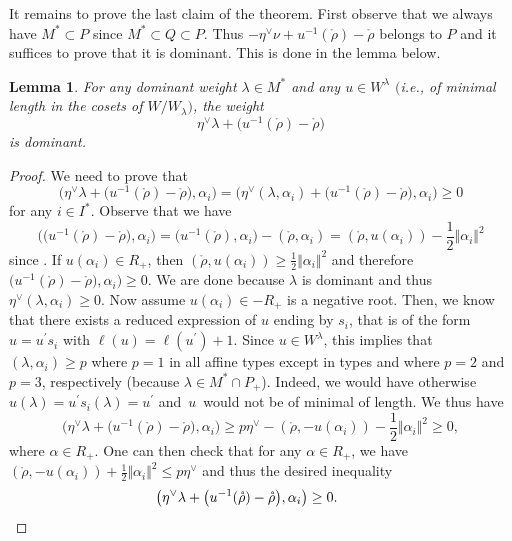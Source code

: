 \documentclass[pdftex]{sigma}
\newtheorem{Lemma}[Theorem]{Lemma}
\numberwithin{equation}{section}
\begin{document}
It remains to prove the last claim of the theorem. First observe that we
always have $M^{\ast}\subset P$ since $M^{\ast}\subset Q\subset P$. Thus
$-\eta^{\vee}\nu+u^{-1}(\mathring{\rho})-\mathring{\rho}$ belongs to $P$ and
it suffices to prove that it is dominant. This is done in the lemma below.

\begin{Lemma}
	For any dominant weight $\lambda\in M^{\ast}$ and any $u\in W^{\lambda}$
	$($i.e., of minimal length in the cosets of $W/W_{\lambda})$, the weight
	\[
	\eta^{\vee}\lambda+\bigl(u^{-1}(\mathring{\rho})-\mathring{\rho}\bigr)
	\]
	is dominant.
\end{Lemma}

\begin{proof}
	We need to prove that
	\[
	\bigl(\eta^{\vee}\lambda+\bigl(u^{-1}(\mathring{\rho})-\mathring{\rho}\bigr),\alpha_{i}%
	\bigr)=\bigl(\eta^{\vee}(\lambda,\alpha_{i})+\bigl(u^{-1}(\mathring{\rho})-\mathring{\rho
	}\bigr), \alpha_{i}\bigr)\geq0
	\]
	for any $i\in I^{\ast}$. Observe that we have
	\[
	\bigl(\bigl(u^{-1}(\mathring{\rho})-\mathring{\rho}\bigr), \alpha_{i}\bigr) =\bigl(u^{-1}(\mathring{\rho
	}),\alpha_{i}\bigr)-(\mathring{\rho},\alpha_{i})=(\mathring{\rho},u(\alpha
	_{i}))-\frac{1}{2} \Vert \alpha_{i} \Vert ^{2}
	\]
	since . If $u(\alpha_{i})\in R_{+}$, then $(\mathring{\rho
	},u(\alpha_{i}))\geq\frac{1}{2} \Vert \alpha_{i} \Vert ^{2}$ and
	therefore $\bigl(u^{-1}(\mathring{\rho})-\mathring{\rho}\bigr),\alpha_{i})\geq0$. We are
	done because $\lambda$ is dominant and thus $\eta^{\vee}(\lambda,\alpha
	_{i})\geq0$. Now assume $u(\alpha_{i})\in-R_{+}$ is a negative root. Then, we
	know that there exists a reduced expression of $u$ ending by $s_{i}$, that is
	of the form $u=u^{\prime}s_{i}$ with $\ell(u)=\ell(u^{\prime})+1$. Since $u\in
	W^{\lambda}$, this implies that $(\lambda,\alpha_{i})\geq p$ where $p=1$ in
	all affine types except in types  and  where $p=2$
	and $p=3$, respectively (because $\lambda\in M^{\ast}\cap P_{+}$). Indeed, we
	would have otherwise $u(\lambda)=u^{\prime}s_{i}(\lambda)=u^{\prime}$ and~$u$~would
    not be of minimal of length. We thus have
	\[
	\bigl(\eta^{\vee}\lambda+\bigl(u^{-1}(\mathring{\rho})-\mathring{\rho}\bigr),\alpha_{i}\bigr)\geq
	p\eta^{\vee}-(\mathring{\rho},-u(\alpha_{i}))-\frac{1}{2} \Vert \alpha
	_{i} \Vert ^{2}\geq0,
	\]
	where $\alpha\in R_{+}$. One can then check that for any $\alpha\in R_{+}$,
	we have $(\mathring{\rho},-u(\alpha_{i}))+\frac{1}{2} \Vert \alpha
	_{i} \Vert ^{2}\leq p\eta^{\vee}$ and thus the desired inequality
	\[
	\bigl(\eta^{\vee}\lambda+\bigl(u^{-1}(\mathring{\rho})-\mathring{\rho}\bigr),\alpha_{i}%
	\bigr)\geq0.\qedhere
\tag*{\qed}
\]
\renewcommand{\qed}{}
\end{proof}
\end{document}
